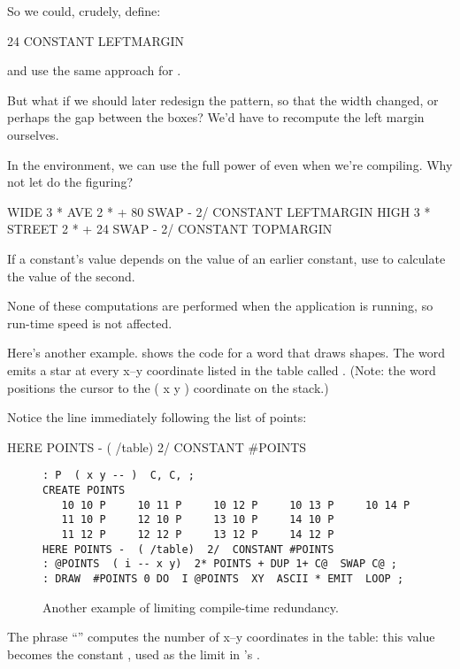 \goodbreak
So we could, crudely, define:

\begin{Code}
24 CONSTANT LEFTMARGIN
\end{Code}
and use the same approach for .

But what if we should later redesign the pattern, so that the width
changed, or perhaps the gap between the boxes? We'd have to recompute
the left margin ourselves.

In the \Forth{} environment, we can use the full power of \Forth{}
even when we're compiling. Why not let \Forth{} do the figuring?

\begin{Code}
WIDE 3 *  AVE 2 *  +  80 SWAP -  2/ CONSTANT LEFTMARGIN
HIGH 3 *  STREET 2 * +  24 SWAP -  2/ CONSTANT TOPMARGIN
\end{Code}

\begin{tip}
If a constant's value depends on the value of an earlier constant, use
\Forth{} to calculate the value of the second.
\end{tip}
None of these computations are performed when the application is
running, so run-time speed is not affected.

Here's another example.  shows the code for a word that
draws shapes. The word  emits a star at every x--y
coordinate listed in the table called . (Note: the word
 positions the cursor to the ( x y ) coordinate on the
stack.)

Notice the line immediately following the list of points:

\begin{Code}
HERE POINTS -  ( /table)  2/  CONSTANT #POINTS
\end{Code}
\begin{figure*}[bbbb]
\caption{Another example of limiting compile-time redundancy.}
\begin{center}
\begin{BVerbatim}
: P  ( x y -- )  C, C, ;
CREATE POINTS
   10 10 P     10 11 P     10 12 P     10 13 P     10 14 P
   11 10 P     12 10 P     13 10 P     14 10 P
   11 12 P     12 12 P     13 12 P     14 12 P
HERE POINTS -  ( /table)  2/  CONSTANT #POINTS
: @POINTS  ( i -- x y)  2* POINTS + DUP 1+ C@  SWAP C@ ;
: DRAW  #POINTS 0 DO  I @POINTS  XY  ASCII * EMIT  LOOP ;
\end{BVerbatim}
\end{center}
\end{figure*}
The phrase ``'' computes the number of x--y
coordinates in the table: this value becomes the constant
, used as the limit in 's .

